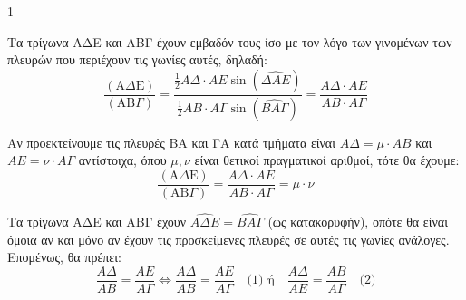 \begin{ylh}{1}
    \item [Ύλη από εικόνα]
\end{ylh}
\begin{figure}
\end{figure}

\begin{alist}
    \item Τα τρίγωνα ΑΔΕ και ΑΒΓ έχουν εμβαδόν τους ίσο με τον λόγο των γινομένων των πλευρών που περιέχουν τις γωνίες αυτές, δηλαδή:
    \[ \frac{(\text{A}\Delta \text{E})}{(\text{AB}\Gamma)} = \frac{\frac{1}{2} A\Delta \cdot AE \sin(\widehat{\Delta AE})}{\frac{1}{2} AB \cdot A\Gamma \sin(\widehat{BA\Gamma})} = \frac{A\Delta \cdot AE}{AB \cdot A\Gamma} \]

    \item Αν προεκτείνουμε τις πλευρές ΒΑ και ΓΑ κατά τμήματα είναι $A\Delta = \mu \cdot AB$ και $AE = \nu \cdot A\Gamma$ αντίστοιχα, όπου $\mu, \nu$ είναι θετικοί πραγματικοί αριθμοί, τότε θα έχουμε:
    \[ \frac{(\text{A}\Delta \text{E})}{(\text{AB}\Gamma)} = \frac{A\Delta \cdot AE}{AB \cdot A\Gamma} = \mu \cdot \nu \]

    \item Τα τρίγωνα ΑΔΕ και ΑΒΓ έχουν $\widehat{A\Delta E} = \widehat{BA\Gamma}$ (ως κατακορυφήν), οπότε θα είναι όμοια αν και μόνο αν έχουν τις προσκείμενες πλευρές σε αυτές τις γωνίες ανάλογες. Επομένως, θα πρέπει:
    \[ \frac{A\Delta}{AB} = \frac{AE}{A\Gamma} \Leftrightarrow \frac{A\Delta}{AB} = \frac{AE}{A\Gamma} \quad \text{(1) ή} \quad \frac{A\Delta}{AE} = \frac{AB}{A\Gamma} \quad \text{(2)} \]
\end{alist}